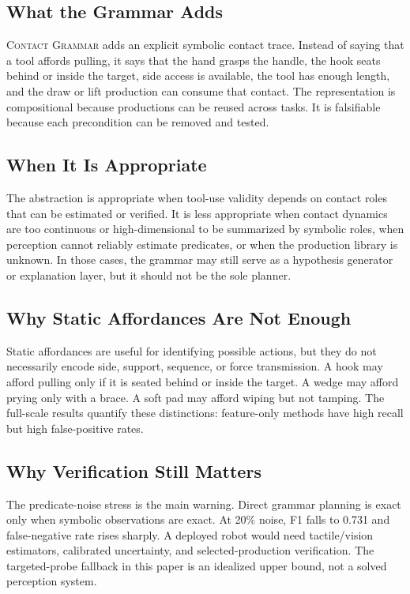 \documentclass{article}
\newcommand{\CG}{\textsc{Contact Grammar}}
\begin{document}
\subsection{What the Grammar Adds}

\CG{} adds an explicit symbolic contact trace. Instead of saying that a tool affords pulling, it says that the hand grasps the handle, the hook seats behind or inside the target, side access is available, the tool has enough length, and the draw or lift production can consume that contact. The representation is compositional because productions can be reused across tasks. It is falsifiable because each precondition can be removed and tested.

\subsection{When It Is Appropriate}

The abstraction is appropriate when tool-use validity depends on contact roles that can be estimated or verified. It is less appropriate when contact dynamics are too continuous or high-dimensional to be summarized by symbolic roles, when perception cannot reliably estimate predicates, or when the production library is unknown. In those cases, the grammar may still serve as a hypothesis generator or explanation layer, but it should not be the sole planner.

\subsection{Why Static Affordances Are Not Enough}

Static affordances are useful for identifying possible actions, but they do not necessarily encode side, support, sequence, or force transmission. A hook may afford pulling only if it is seated behind or inside the target. A wedge may afford prying only with a brace. A soft pad may afford wiping but not tamping. The full-scale results quantify these distinctions: feature-only methods have high recall but high false-positive rates.

\subsection{Why Verification Still Matters}

The predicate-noise stress is the main warning. Direct grammar planning is exact only when symbolic observations are exact. At 20\% noise, F1 falls to 0.731 and false-negative rate rises sharply. A deployed robot would need tactile/vision estimators, calibrated uncertainty, and selected-production verification. The targeted-probe fallback in this paper is an idealized upper bound, not a solved perception system.
\end{document}
